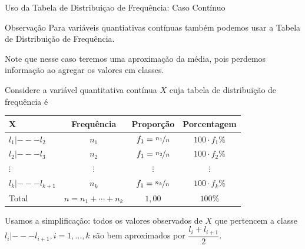 \documentclass[8pt]{beamer}
\begin{document}
\begin{frame}{Uso da Tabela de Distribuiçao de Frequência: Caso Contínuo}
 \begin{block}{Observação}
  Para variáveis quantiativas contínuas também podemos usar a Tabela de Distribuição de Frequência. 
  
  Note que nesse caso teremos uma {\color{red} aproximação} da média, pois perdemos informação ao agregar os valores 
  em classes.
 \end{block}
 
 Considere a variável quantitativa contínua $X$ cuja tabela de distribuição de frequência é
 
 {\tiny
 \begin{table}
  \centering
  \begin{tabular}{l|ccc}
    \toprule[0.05cm]
    X & Frequência & Proporção & Porcentagem \\ \midrule[0.05cm]
    $l_1 |--- l_2$ & $n_1$ & $f_1=\nicefrac{n_1}{n}$ & $100\cdot f_1 \%$ \\ \hline
    $l_2 |--- l_3$ & $n_2$ & $f_1=\nicefrac{n_2}{n}$ & $100\cdot f_2 \%$ \\ \hline
    $\vdots$ & $\vdots$ & $\vdots$ & $\vdots$\\ \hline
    $l_k |--- l_{k+1}$ & $n_k$ & $f_1=\nicefrac{n_k}{n}$ & $100\cdot f_k \%$ \\ \midrule[0.05cm]
    Total & $n=n_1+\cdots+n_k$ & $1,00$ & $100\%$\\ \bottomrule[0.05cm]
  \end{tabular}
 \end{table}
 }

 Usamos a simplificação: todos os valores observados de $X$ que pertencem a classe $l_i |--- l_{i+1}, i =1, \dots, k$ são bem aproximados por $\dfrac{l_i+l_{i+1}}{2}$.
\end{frame}
\end{document}

